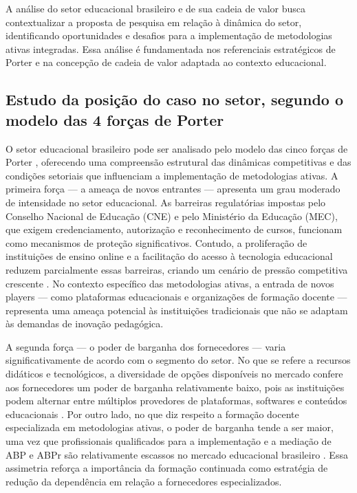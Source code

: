 A análise do setor educacional brasileiro e de sua cadeia de valor busca contextualizar a proposta de pesquisa em relação à dinâmica do setor, identificando oportunidades e desafios para a implementação de metodologias ativas integradas. Essa análise é fundamentada nos referenciais estratégicos de Porter e na concepção de cadeia de valor adaptada ao contexto educacional.

\subsection{Estudo da posição do caso no setor, segundo o modelo das 4 forças de Porter}
\label{subsec:porter}

O setor educacional brasileiro pode ser analisado pelo modelo das cinco forças de Porter \cite{PORTER1980}, oferecendo uma compreensão estrutural das dinâmicas competitivas e das condições setoriais que influenciam a implementação de metodologias ativas. A primeira força — a ameaça de novos entrantes — apresenta um grau moderado de intensidade no setor educacional. As barreiras regulatórias impostas pelo Conselho Nacional de Educação (CNE) e pelo Ministério da Educação (MEC), que exigem credenciamento, autorização e reconhecimento de cursos, funcionam como mecanismos de proteção significativos. Contudo, a proliferação de instituições de ensino online e a facilitação do acesso à tecnologia educacional reduzem parcialmente essas barreiras, criando um cenário de pressão competitiva crescente \cite{SELWYN2022}. No contexto específico das metodologias ativas, a entrada de novos players — como plataformas educacionais e organizações de formação docente — representa uma ameaça potencial às instituições tradicionais que não se adaptam às demandas de inovação pedagógica.

A segunda força — o poder de barganha dos fornecedores — varia significativamente de acordo com o segmento do setor. No que se refere a recursos didáticos e tecnológicos, a diversidade de opções disponíveis no mercado confere aos fornecedores um poder de barganha relativamente baixo, pois as instituições podem alternar entre múltiplos provedores de plataformas, softwares e conteúdos educacionais \cite{MEZZARI2011}. Por outro lado, no que diz respeito a formação docente especializada em metodologias ativas, o poder de barganha tende a ser maior, uma vez que profissionais qualificados para a implementação e a mediação de ABP e ABPr são relativamente escassos no mercado educacional brasileiro \cite{CANTANHEDE2026}. Essa assimetria reforça a importância da formação continuada como estratégia de redução da dependência em relação a fornecedores especializados.

